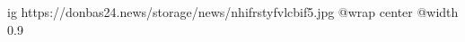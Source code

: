  
 
 
 
 

\ifcmt
  ig https://donbas24.news/storage/news/nhifrstyfvlcbif5.jpg
  @wrap center
  @width 0.9
\fi
